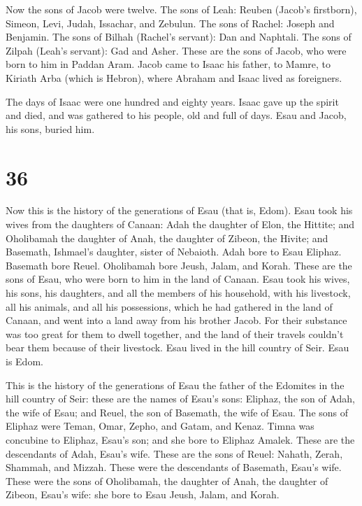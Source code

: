 Now the sons of Jacob were twelve.  The sons of Leah:
Reuben (Jacob's firstborn), Simeon, Levi, Judah, Issachar, and Zebulun.
 The sons of Rachel: Joseph and Benjamin. 
The sons of Bilhah (Rachel's servant): Dan and Naphtali. 
The sons of Zilpah (Leah's servant): Gad and Asher. These are the sons
of Jacob, who were born to him in Paddan Aram.  Jacob
came to Isaac his father, to Mamre, to Kiriath Arba (which is Hebron),
where Abraham and Isaac lived as foreigners.

 The days of Isaac were one hundred and eighty years.
 Isaac gave up the spirit and died, and was gathered to
his people, old and full of days. Esau and Jacob, his sons, buried him.

\hypertarget{section-35}{%
\section{36}\label{section-35}}

 Now this is the history of the generations of Esau (that
is, Edom).  Esau took his wives from the daughters of
Canaan: Adah the daughter of Elon, the Hittite; and Oholibamah the
daughter of Anah, the daughter of Zibeon, the Hivite;  and
Basemath, Ishmael's daughter, sister of Nebaioth.  Adah
bore to Esau Eliphaz. Basemath bore Reuel.  Oholibamah
bore Jeush, Jalam, and Korah. These are the sons of Esau, who were born
to him in the land of Canaan.  Esau took his wives, his
sons, his daughters, and all the members of his household, with his
livestock, all his animals, and all his possessions, which he had
gathered in the land of Canaan, and went into a land away from his
brother Jacob.  For their substance was too great for them
to dwell together, and the land of their travels couldn't bear them
because of their livestock.  Esau lived in the hill
country of Seir. Esau is Edom.

 This is the history of the generations of Esau the father
of the Edomites in the hill country of Seir:  these are
the names of Esau's sons: Eliphaz, the son of Adah, the wife of Esau;
and Reuel, the son of Basemath, the wife of Esau.  The
sons of Eliphaz were Teman, Omar, Zepho, and Gatam, and Kenaz.
 Timna was concubine to Eliphaz, Esau's son; and she bore
to Eliphaz Amalek. These are the descendants of Adah, Esau's wife.
 These are the sons of Reuel: Nahath, Zerah, Shammah, and
Mizzah. These were the descendants of Basemath, Esau's wife.
 These were the sons of Oholibamah, the daughter of Anah,
the daughter of Zibeon, Esau's wife: she bore to Esau Jeush, Jalam, and
Korah.

